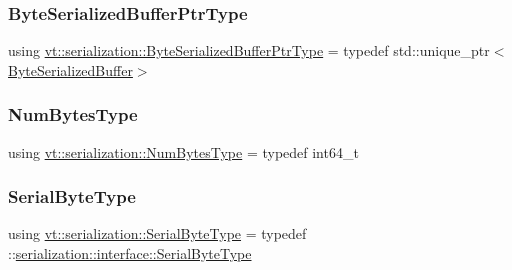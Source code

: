 \mbox{\label{namespacevt_1_1serialization_a8f2372c7f89aee28287323667fac2cf5}} 
\subsubsection{\texorpdfstring{Byte\+Serialized\+Buffer\+Ptr\+Type}{ByteSerializedBufferPtrType}}
{\footnotesize\ttfamily using \hyperlink{namespacevt_1_1serialization_a8f2372c7f89aee28287323667fac2cf5}{vt\+::serialization\+::\+Byte\+Serialized\+Buffer\+Ptr\+Type} = typedef std\+::unique\+\_\+ptr$<$\hyperlink{structvt_1_1serialization_1_1_byte_serialized_buffer}{Byte\+Serialized\+Buffer}$>$}

\mbox{\label{namespacevt_1_1serialization_aaa03b9b407ed5776043c163629312e40}} 
\subsubsection{\texorpdfstring{Num\+Bytes\+Type}{NumBytesType}}
{\footnotesize\ttfamily using \hyperlink{namespacevt_1_1serialization_aaa03b9b407ed5776043c163629312e40}{vt\+::serialization\+::\+Num\+Bytes\+Type} = typedef int64\+\_\+t}

\mbox{\label{namespacevt_1_1serialization_a74f8d1a55940f9c38fc29522de66d926}} 
\subsubsection{\texorpdfstring{Serial\+Byte\+Type}{SerialByteType}}
{\footnotesize\ttfamily using \hyperlink{namespacevt_1_1serialization_a74f8d1a55940f9c38fc29522de66d926}{vt\+::serialization\+::\+Serial\+Byte\+Type} = typedef \+::\hyperlink{namespaceserialization_1_1interface_a718748616a908c35e6080b71d7790a76}{serialization\+::interface\+::\+Serial\+Byte\+Type}}

